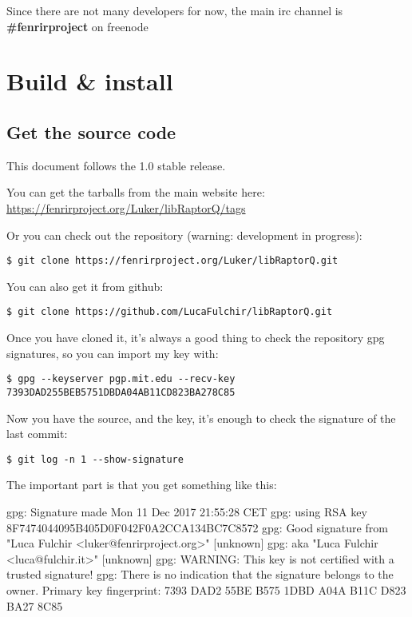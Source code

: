 \documentclass[11pt,a4paper]{refart}
\begin{document}
 Since there are not many developers for now, the main irc channel is \textbf{\#fenrirproject} on freenode


\section{Build \& install}
\subsection{Get the source code}
This document follows the 1.0 stable release.

You can get the tarballs from the main website here:\\
\href{https://fenrirproject.org/Luker/libRaptorQ/tags}{https://fenrirproject.org/Luker/libRaptorQ/tags}

Or you can check out the repository (warning: development in progress):

\begin{verbatim}
$ git clone https://fenrirproject.org/Luker/libRaptorQ.git
\end{verbatim}

You can also get it from github:

\begin{verbatim}
$ git clone https://github.com/LucaFulchir/libRaptorQ.git
\end{verbatim}

Once you have cloned it, it's always a good thing to check the repository gpg
signatures, so you can import my key with:

\begin{verbatim}
$ gpg --keyserver pgp.mit.edu --recv-key 7393DAD255BEB5751DBDA04AB11CD823BA278C85
\end{verbatim}


Now you have the source, and the key, it's enough to check the signature of the
last commit:

\begin{verbatim}
$ git log -n 1 --show-signature
\end{verbatim}

The important part is that you get something like this:

\begin{verbbox}[\footnotesize]
 gpg: Signature made Mon 11 Dec 2017 21:55:28 CET
 gpg:                using RSA key 8F7474044095B405D0F042F0A2CCA134BC7C8572
 gpg: Good signature from "Luca Fulchir <luker@fenrirproject.org>" [unknown]
 gpg:                 aka "Luca Fulchir <luca@fulchir.it>" [unknown]
 gpg: WARNING: This key is not certified with a trusted signature!
 gpg:          There is no indication that the signature belongs to the owner.
 Primary key fingerprint: 7393 DAD2 55BE B575 1DBD A04A B11C D823 BA27 8C85
\end{verbbox}
\theverbbox
\end{document}
